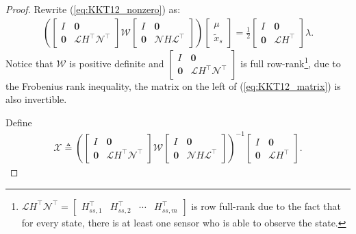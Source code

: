 \documentclass[journal]{IEEEtran}
\newcommand{\Nc}{{\mathcal{N}}}
\newcommand{\Wc}{{\mathcal{W}}}
\newcommand{\Lc}{{\mathcal{L}}}
\newcommand{\Xc}{{\mathcal{X}}}
\newtheorem*{proof}{\textbf{Proof}}
\begin{document}
\begin{proof}
		Rewrite (\ref{eq:KKT12_nonzero}) as:
		\begin{align}\label{eq:KKT12_matrix}
			\left(
			\begin{bmatrix}
				I & \mathbf{0} \\
				\mathbf{0}  &  \Lc H^{\top} \Nc^{\top}
			\end{bmatrix}
			\Wc
			\begin{bmatrix}
				I & \mathbf{0} \\
				\mathbf{0}  &  \Nc H \Lc^{\top}
			\end{bmatrix}
			\right)
			\begin{bmatrix}
				\mu \\ \tilde{x}_s
			\end{bmatrix}=\frac{1}{2}
			\begin{bmatrix}
				I & \mathbf{0} \\
				\mathbf{0}  &  \Lc H^{\top}
			\end{bmatrix}
			\lambda .
		\end{align}
		Notice that $\Wc$ is positive definite and $\begin{bmatrix}
			I & \mathbf{0} \\
			\mathbf{0}  &  \Lc H^{\top} \Nc^{\top}
		\end{bmatrix}$
		is full row-rank\footnote{
			$\Lc H^{\top} \Nc^{\top}=
			\begin{bmatrix}
				H^{\top}_{ss,1} & H^{\top}_{ss,2} & \cdots & H^{\top}_{ss,m}
			\end{bmatrix}
			$ is row full-rank due to the fact that for every state, there is at least one sensor who is able to observe the state.
		}, 
		due to the Frobenius rank inequality, the matrix on the left of (\ref{eq:KKT12_matrix}) is also invertible.
		
		Define
		\begin{align}\label{eq:def_H}
			\Xc	\triangleq
			\left(
			\begin{bmatrix}
				I & \mathbf{0} \\
				\mathbf{0}  &  \Lc H^{\top} \Nc^{\top}
			\end{bmatrix}
			\Wc
			\begin{bmatrix}
				I & \mathbf{0} \\
				\mathbf{0}  &  \Nc H \Lc^{\top}
			\end{bmatrix}
			\right)^{-1}
			\begin{bmatrix}
				I & \mathbf{0} \\ \mathbf{0} &\Lc H^{\top}
			\end{bmatrix}.
		\end{align}
		

\end{proof}
\end{document}
